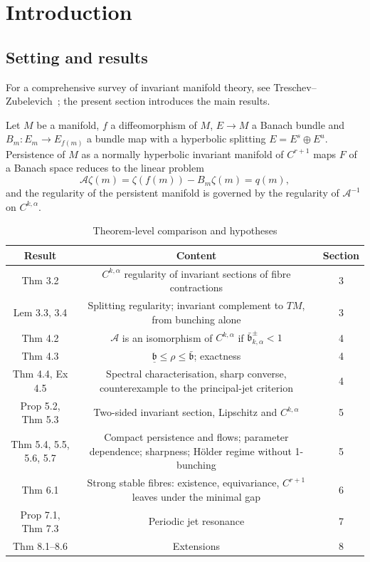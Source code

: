 \documentclass[11pt,a4paper]{article}
\theoremstyle{plain}
\theoremstyle{definition}
\theoremstyle{remark}
\numberwithin{equation}{section}
\numberwithin{figure}{section}
\begin{document}
\section{Introduction}

\subsection{Setting and results}

For a comprehensive survey of invariant manifold theory, see Treschev–Zubelevich~\cite{tre2010}; the present section introduces the main results.

Let $M$ be a manifold, $f$ a diffeomorphism of $M$, $E\to M$ a Banach bundle and $B_m:E_m\to E_{f(m)}$ a bundle map with a hyperbolic splitting $E=E^s\oplus E^u$. Persistence of $M$ as a normally hyperbolic invariant manifold of $C^{r+1}$ maps $F$ of a Banach space reduces to the linear problem
\[
\mathcal A\zeta(m)=\zeta(f(m))-B_m\zeta(m)=q(m),
\]
and the regularity of the persistent manifold is governed by the regularity of $\mathcal A^{-1}$ on $C^{k,\alpha}$.

\begin{table}[h]
\centering
\begin{tabular}{c|c|c}
\toprule
Result & Content & Section\\
\midrule
Thm 3.2 & $C^{k,\alpha}$ regularity of invariant sections of fibre contractions & 3 \\
Lem 3.3, 3.4 & Splitting regularity; invariant complement to $TM$, from bunching alone & 3 \\
Thm 4.2 & $\mathcal A$ is an isomorphism of $C^{k,\alpha}$ if $\bar{\mathfrak b}^\pm_{k,\alpha}<1$ & 4 \\
Thm 4.3 & $\underline{\mathfrak b}\le\rho\le\bar{\mathfrak b}$; exactness & 4 \\
Thm 4.4, Ex 4.5 & Spectral characterisation, sharp converse, counterexample to the principal-jet criterion & 4 \\
Prop 5.2, Thm 5.3 & Two-sided invariant section, Lipschitz and $C^{k,\alpha}$ & 5 \\
Thm 5.4, 5.5, 5.6, 5.7 & Compact persistence and flows; parameter dependence; sharpness; Hölder regime without 1-bunching & 5 \\
Thm 6.1 & Strong stable fibres: existence, equivariance, $C^{r+1}$ leaves under the minimal gap & 6 \\
Prop 7.1, Thm 7.3 & Periodic jet resonance & 7 \\
Thm 8.1–8.6 & Extensions & 8 \\
\bottomrule
\end{tabular}
\caption{Theorem-level comparison and hypotheses}
\label{tab:results}
\end{table}
\end{document}
